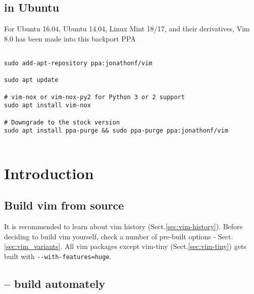 \subsection{in Ubuntu}


For Ubuntu 16.04, Ubuntu 14.04, Linux Mint 18/17, and their derivatives, Vim 8.0
has been made into this backport PPA
\begin{verbatim}

sudo add-apt-repository ppa:jonathonf/vim

sudo apt update

# vim-nox or vim-nox-py2 for Python 3 or 2 support
sudo apt install vim-nox

# Downgrade to the stock version
sudo apt install ppa-purge && sudo ppa-purge ppa:jonathonf/vim


\end{verbatim}

\section{Introduction}

\subsection{Build vim from source}
\label{sec:vim-build-from-source}

It is recommended to learn about vim history (Sect.\ref{sec:vim-history}).
Before deciding to build vim yourself, check a number of pre-built options -
Sect.\ref{sec:vim_variants}. All vim packages except vim-tiny
(Sect.\ref{sec:vim-tiny}) gets built with \verb!--with-features=huge!.

\subsection{-- build automately}



